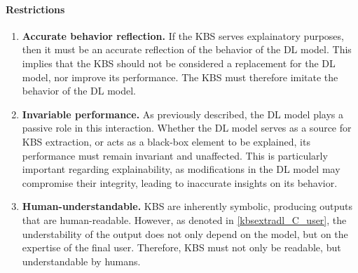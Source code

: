 \paragraph{Restrictions}
\begin{enumerate} [start=1,label={\bfseries R\arabic*.}]
    \item \textbf{Accurate behavior reflection.} \label{kbsextradl_R_behavior} If the KBS serves explainatory purposes, then it must be an accurate reflection of the behavior of the DL model. This implies that the KBS should not be considered a replacement for the DL model, nor improve its performance. The KBS must therefore imitate the behavior of the DL model.
    
    \item \textbf{Invariable performance.} \label{kbsextradl_R_performance} As previously described, the DL model plays a passive role in this interaction.  Whether the DL model serves as a source for KBS extraction, or acts as a black-box element to be explained, its performance must remain invariant and unaffected. This is particularly important regarding explainability, as modifications in the DL model may compromise their integrity, leading to inaccurate insights on its behavior. 
    
    \item \textbf{Human-understandable.} \label{kbsextradl_R_human} KBS are inherently symbolic, producing outputs that are human-readable. However, as denoted in \ref{kbsextradl_C_user}, the understability of the output does not only depend on the model, but on the expertise of the final user. Therefore, KBS must not only be readable, but understandable by humans.
\end{enumerate}

